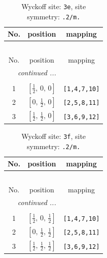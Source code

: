 \documentclass[fleqn,8pt]{jsarticle}
\begin{document}
\begin{longtable}{ccc}
\caption{Wyckoff site: {\tt 3e}, site symmetry: {\tt .2/m.}}
 \\
 \hline \hline
No. & position & mapping \\ \hline \endfirsthead

\multicolumn{2}{l}{\tablename\ \thetable{}} \\
 \hline \hline
No. & position & mapping \\ \hline \endhead

 \hline \hline
\multicolumn{2}{r}{\footnotesize\it continued ...} \\ \endfoot

 \hline \hline
\multicolumn{2}{r}{} \\ \endlastfoot

1 & $\left[ \frac{1}{2},\, 0,\, 0 \right]$ & {\tt [1,4,7,10]} \\ \hline
2 & $\left[ 0,\, \frac{1}{2},\, 0 \right]$ & {\tt [2,5,8,11]} \\ \hline
3 & $\left[ \frac{1}{2},\, \frac{1}{2},\, 0 \right]$ & {\tt [3,6,9,12]} \\
\end{longtable}
\renewcommand{\arraystretch}{1.2}
\begin{longtable}{ccc}
\caption{Wyckoff site: {\tt 3f}, site symmetry: {\tt .2/m.}}
 \\
 \hline \hline
No. & position & mapping \\ \hline \endfirsthead

\multicolumn{2}{l}{\tablename\ \thetable{}} \\
 \hline \hline
No. & position & mapping \\ \hline \endhead

 \hline \hline
\multicolumn{2}{r}{\footnotesize\it continued ...} \\ \endfoot

 \hline \hline
\multicolumn{2}{r}{} \\ \endlastfoot

1 & $\left[ \frac{1}{2},\, 0,\, \frac{1}{2} \right]$ & {\tt [1,4,7,10]} \\ \hline
2 & $\left[ 0,\, \frac{1}{2},\, \frac{1}{2} \right]$ & {\tt [2,5,8,11]} \\ \hline
3 & $\left[ \frac{1}{2},\, \frac{1}{2},\, \frac{1}{2} \right]$ & {\tt [3,6,9,12]} \\
\end{longtable}
\renewcommand{\arraystretch}{1.2}
\end{document}
